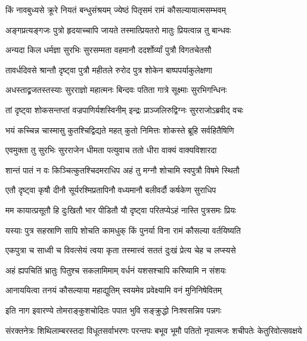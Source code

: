 \twolineshloka
{किं नावबुध्यसे क्रूरे नियतं बन्धुसंश्रयम्}
{ज्येष्ठं पितृसमं रामं कौसल्यायात्मसम्भवम्} %

\twolineshloka
{अङ्गप्रत्यङ्गजः पुत्रो हृदयाच्चापि जायते}
{तस्मात्प्रियतरो मातुः प्रियत्वान्न तु बान्धवः} %

\twolineshloka
{अन्यदा किल धर्मज्ञा सुरभिः सुरसम्मता}
{वहमानौ ददर्शोर्व्यां पुत्रौ विगतचेतसौ} %

\twolineshloka
{तावर्धदिवसे श्रान्तौ दृष्ट्वा पुत्रौ महीतले}
{रुरोद पुत्र शोकेन बाष्पपर्याकुलेक्षणा} %

\twolineshloka
{अधस्ताद्व्रजतस्तस्याः सुरराज्ञो महात्मनः}
{बिन्दवः पतिता गात्रे सूक्ष्माः सुरभिगन्धिनः} %

\twolineshloka
{तां दृष्ट्वा शोकसन्तप्तां वज्रपाणिर्यशस्विनीम्}
{इन्द्रः प्राञ्जलिरुद्विग्नः सुरराजोऽब्रवीद् वचः} %

\twolineshloka
{भयं कच्चिन्न चास्मासु कुतश्चिद्विद्यते महत्}
{कुतो निमित्तः शोकस्ते ब्रूहि सर्वहितैषिणि} %

\twolineshloka
{एवमुक्ता तु सुरभिः सुरराजेन धीमता}
{पत्युवाच ततो धीरा वाक्यं वाक्यविशारदा} %

\twolineshloka
{शान्तं पातं न वः किञ्चित्कुतश्चिदमराधिप}
{अहं तु मग्नौ शोचामि स्वपुत्रौ विषमे स्थितौ} %

\twolineshloka
{एतौ दृष्ट्वा कृषौ दीनौ सूर्यरश्मिप्रतापिनौ}
{वध्यमानौ बलीवर्दौ कर्षकेण सुराधिप} %

\twolineshloka
{मम कायात्प्रसूतौ हि दुःखितौ भार पीडितौ}
{यौ दृष्ट्वा परितप्येऽहं नास्ति पुत्रसमः प्रियः} %

\twolineshloka
{यस्याः पुत्र सहस्राणि सापि शोचति कामधुक्}
{किं पुनर्या विना रामं कौसल्या वर्तयिष्यति} %

\twolineshloka
{एकपुत्रा च साध्वी च विवत्सेयं त्वया कृता}
{तस्मात्त्वं सततं दुःखं प्रेत्य चेह च लप्स्यसे} %

\twolineshloka
{अहं ह्यपचितिं भ्रातुः पितुश्च सकलामिमाम्}
{वर्धनं यशसश्चापि करिष्यामि न संशयः} %

\twolineshloka
{आनाययित्वा तनयं कौसल्याया महाद्युतिम्}
{स्वयमेव प्रवेक्ष्यामि वनं मुनिनिषेवितम्} %

\twolineshloka
{इति नाग इवारण्ये तोमराङ्कुशचोदितः}
{पपात भुवि सङ्क्रुद्धो निःश्वसन्निव पन्नगः} %

\fourlineindentedshloka
{संरक्तनेत्रः शिथिलाम्बरस्तदा}
{विधूतसर्वाभरणः परन्तपः}
{बभूव भूमौ पतितो नृपात्मजः}
{शचीपतेः केतुरिवोत्सवक्षये} %



